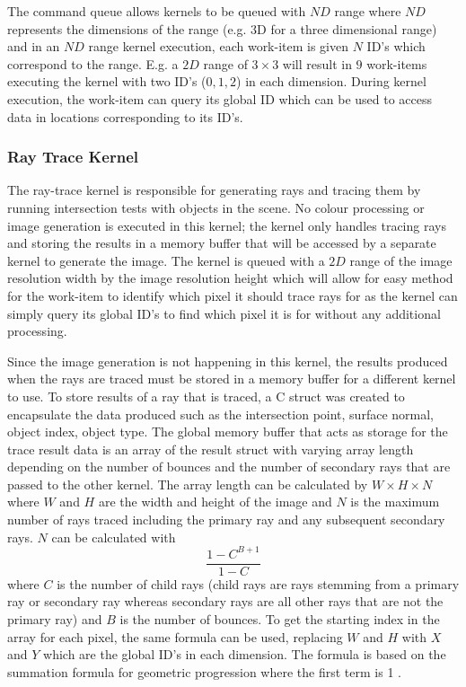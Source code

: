 \documentclass[final]{cmpreport}
\begin{document}
The command queue allows kernels to be queued with $ND$ range where $ND$ represents the dimensions of the range (e.g. 3D for a three dimensional range) and in an $ND$ range kernel execution, each work-item is given $N$ ID's which correspond to the range. E.g. a $2D$ range of $3 \times 3$ will result in $9$ work-items executing the kernel with two ID's ($0, 1, 2$) in each dimension. During kernel execution, the work-item can query its global ID which can be used to access data in locations corresponding to its ID's.

\subsubsection{Ray Trace Kernel}

The ray-trace kernel is responsible for generating rays and tracing them by running intersection tests with objects in the scene. No colour processing or image generation is executed in this kernel; the kernel only handles tracing rays and storing the results in a memory buffer that will be accessed by a separate kernel to generate the image. The kernel is queued with a $2D$ range of the image resolution width by the image resolution height which will allow for easy method for the work-item to identify which pixel it should trace rays for as the kernel can simply query its global ID's to find which pixel it is for without any additional processing.

Since the image generation is not happening in this kernel, the results produced when the rays are traced must be stored in a memory buffer for a different kernel to use. To store results of a ray that is traced, a C struct was created to encapsulate the data produced such as the intersection point, surface normal, object index, object type. The global memory buffer that acts as storage for the trace result data is an array of the result struct with varying array length depending on the number of bounces and the number of secondary rays that are passed to the other kernel. The array length can be calculated by $W \times H \times N$ where $W$ and $H$ are the width and height of the image and $N$ is the maximum number of rays traced including the primary ray and any subsequent secondary rays. $N$ can be calculated with $$\frac{1 - C^{B+1}}{1-C}$$ where $C$ is the number of child rays (child rays are rays stemming from a primary ray or secondary ray whereas secondary rays are all other rays that are not the primary ray) and $B$ is the number of bounces.
To get the starting index in the array for each pixel, the same formula can be used, replacing $W$ and $H$ with $X$ and $Y$ which are the global ID's in each dimension. The formula is based on the summation formula for geometric progression where the first term is 1 \citep{rosen1999handbook}.
\end{document}

